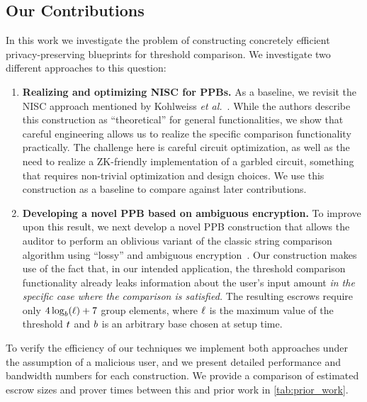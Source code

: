 \subsection{Our Contributions}
In this work we investigate the problem of constructing concretely efficient privacy-preserving blueprints for threshold comparison. We investigate two different approaches to this question:
\begin{enumerate}
	\item {\bf Realizing and optimizing NISC for PPBs.} As a baseline, we revisit the NISC approach mentioned by Kohlweiss \emph{et al.}~\cite{EC:KohLysNgu23}. While the authors describe this construction as ``theoretical'' for general functionalities, we show that careful engineering allows us to realize the specific comparison functionality practically. The challenge here is careful circuit optimization, as well as the need to realize a ZK-friendly implementation of a garbled circuit, something that requires non-trivial optimization and design choices. We use this construction as a baseline to compare against later contributions.

	\item {\bf Developing a novel PPB based on ambiguous encryption.}
	      To improve upon this result, we next develop a novel PPB construction that allows the auditor to perform an oblivious variant of the classic string comparison algorithm using ``lossy'' and ambiguous encryption~\cite{CCS:BLMG21}.
	      Our construction makes use of the fact that, in our intended application, the threshold comparison functionality already leaks information about the user's input amount \emph{in the specific case where the comparison is satisfied.}
	      The resulting escrows require only $4\log_{b}(\ell) + 7$ group elements, where $\ell$ is the maximum value of the threshold $t$ and $b$ is an arbitrary base chosen at setup time.
\end{enumerate}
To verify the efficiency of our techniques we implement both approaches under the assumption of a malicious user, and we present detailed performance and bandwidth numbers for each construction. We provide a comparison of estimated escrow sizes and prover times between this and prior work in \cref{tab:prior_work}.

